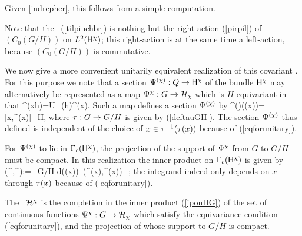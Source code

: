 Given \ref{indrepher}, this follows from a simple computation.\enp

Note that the \rep\ (\ref{tilpiuchbr}) is nothing but the right-action (\ref{pirpil}) of
$(C_0(G/H))$  on $L^2({\sf H}^{\chi})$; this right-action is at the same time a left-action, because
$(C_0(G/H))$ is commutative.

We now give a more convenient unitarily equivalent realization of this covariant \rep.
For this purpose we note that a section $\Psi^{(\chi)}:Q\rightarrow {\sf H}^{\chi}$ of the  bundle ${\sf H}^{\chi}$   may
alternatively be represented
as a  map $\Psi^{\chi}:G\rightarrow {\cal H}_{\chi}$ which is $H$-equivariant in that
\be
\Ps^{\ch}(xh\inv)=U_{\ch}(h)\Ps^{\ch}(x). 
\ee
Such a map defines a section $\Psi^{(\chi)}$ by 
\be
\Ps^{(\ch)}(\ta(x))=[x,\Ps^{\ch}(x)]_H, 
\ee
where $\tau:G\rightarrow G/H$ is given by (\ref{deftauGH}). The section $\Psi^{(\chi)}$ thus
defined is independent of the choice of
$x\in\tau^{-1}(\tau(x))$ because of (\ref{eqforunitary}). 


For $\Psi^{(\chi)}$ to lie in $\Gamma_c({\sf H}^{\chi})$, 
the projection of the support of $\Psi^{\chi}$ from $G$ to
$G/H$ must be compact. 
In this realization  the inner product on $\Gamma_c({\sf H}^{\chi})$ is given by 
\be
(\Ps^{\ch},\Ph^{\ch}):=\int_{G/H} d\nu(\ta(x))\, (\Ps^{\ch}(x),\Ph^{\ch}(x))_{\ch}; 
\ee
 the integrand indeed only depends on $x$ through $\tau(x)$ because of (\ref{eqforunitary}). 
\begin{Definition}
The \Hs\ ${\cal H}^{\chi}$ is the completion  in the inner product (\ref{iponHG})
of the set of continuous functions
$\Psi^{\chi}:G\rightarrow{\cal H}_{\chi}$ which satisfy the equivariance condition
(\ref{eqforunitary}), and the projection of whose support to $G/H$ is
compact.
\end{Definition}

